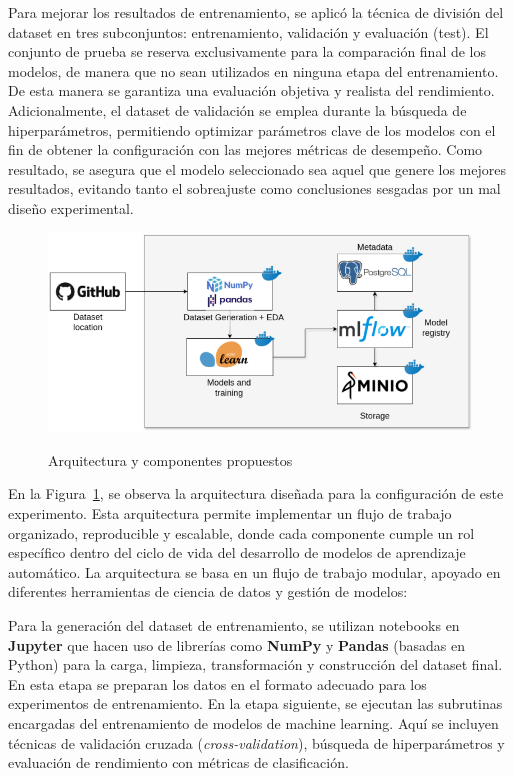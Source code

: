 \documentclass[11pt,a4paper,spanish]{book}
\numberwithin{equation}{chapter}
\numberwithin{figure}{chapter}
\begin{document}
Para mejorar los resultados de entrenamiento, se aplicó la técnica de división del 
dataset en tres subconjuntos: entrenamiento, validación y evaluación (test). 
El conjunto de prueba se reserva exclusivamente para la comparación final de los modelos,
de manera que no sean utilizados en ninguna etapa del entrenamiento. 
De esta manera se garantiza una evaluación objetiva y realista del rendimiento. 
Adicionalmente, el dataset de validación se emplea durante la búsqueda de 
hiperparámetros, permitiendo optimizar parámetros clave de los modelos con el fin de 
obtener la configuración con las mejores métricas de desempeño. Como resultado, se 
asegura que el modelo seleccionado sea aquel que genere los mejores resultados, evitando
tanto el sobreajuste como conclusiones sesgadas por un mal diseño experimental.


\begin{figure}[h]
    \caption{Arquitectura y componentes propuestos}
    \centering
    \includegraphics[width=1\textwidth]{media/arquitecura.png}
    \label{fig:figArchitecture}
\end{figure}


En la Figura~\ref{fig:figArchitecture}, se observa la arquitectura diseñada para la 
configuración de este experimento. Esta arquitectura permite implementar un flujo de 
trabajo organizado, reproducible y escalable, donde cada componente cumple un rol 
específico dentro del ciclo de vida del desarrollo de modelos de aprendizaje automático.
La arquitectura se basa en un flujo de trabajo modular, apoyado en diferentes 
herramientas de ciencia de datos y gestión de modelos:


Para la generación del dataset de entrenamiento, se utilizan notebooks en \textbf{Jupyter} 
que hacen uso de librerías como \textbf{NumPy} y \textbf{Pandas} (basadas en Python) para 
la carga, limpieza, transformación y construcción del dataset final. En esta etapa se 
preparan los datos en el formato adecuado para los experimentos de entrenamiento. 
En la etapa siguiente, se ejecutan las subrutinas encargadas del entrenamiento de 
modelos de machine learning. Aquí se incluyen técnicas de 
validación cruzada (\textit{cross-validation}), búsqueda de hiperparámetros 
y evaluación de rendimiento con métricas de clasificación.
\end{document}

